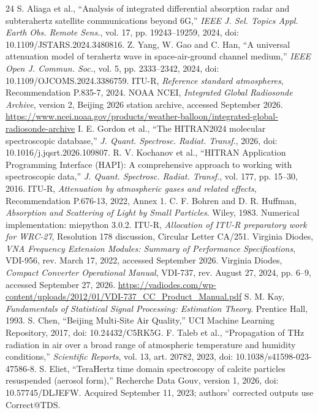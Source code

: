 \documentclass[conference]{IEEEtran}
\begin{document}
\begin{thebibliography}{24}
 S. Aliaga et al., ``Analysis of integrated differential absorption radar and subterahertz satellite communications beyond 6G,'' \emph{IEEE J. Sel. Topics Appl. Earth Obs. Remote Sens.}, vol. 17, pp. 19243--19259, 2024, doi: 10.1109/JSTARS.2024.3480816.
 Z. Yang, W. Gao and C. Han, ``A universal attenuation model of terahertz wave in space-air-ground channel medium,'' \emph{IEEE Open J. Commun. Soc.}, vol. 5, pp. 2333--2342, 2024, doi: 10.1109/OJCOMS.2024.3386759.
 ITU-R, \emph{Reference standard atmospheres}, Recommendation P.835-7, 2024.
 NOAA NCEI, \emph{Integrated Global Radiosonde Archive}, version 2, Beijing 2026 station archive, accessed September 2026. \url{https://www.ncei.noaa.gov/products/weather-balloon/integrated-global-radiosonde-archive}
 I. E. Gordon et al., ``The HITRAN2024 molecular spectroscopic database,'' \emph{J. Quant. Spectrosc. Radiat. Transf.}, 2026, doi: 10.1016/j.jqsrt.2026.109807.
 R. V. Kochanov et al., ``HITRAN Application Programming Interface (HAPI): A comprehensive approach to working with spectroscopic data,'' \emph{J. Quant. Spectrosc. Radiat. Transf.}, vol. 177, pp. 15--30, 2016.
 ITU-R, \emph{Attenuation by atmospheric gases and related effects}, Recommendation P.676-13, 2022, Annex 1.
 C. F. Bohren and D. R. Huffman, \emph{Absorption and Scattering of Light by Small Particles}. Wiley, 1983. Numerical implementation: miepython 3.0.2.
 ITU-R, \emph{Allocation of ITU-R preparatory work for WRC-27}, Resolution 178 discussion, Circular Letter CA/251.
 Virginia Diodes, \emph{VNA Frequency Extension Modules: Summary of Performance Specifications}, VDI-956, rev. March 17, 2022, accessed September 2026.
 Virginia Diodes, \emph{Compact Converter Operational Manual}, VDI-737, rev. August 27, 2024, pp. 6--9, accessed September 27, 2026. \url{https://vadiodes.com/wp-content/uploads/2012/01/VDI-737_CC_Product_Manual.pdf}
 S. M. Kay, \emph{Fundamentals of Statistical Signal Processing: Estimation Theory}. Prentice Hall, 1993.
 S. Chen, ``Beijing Multi-Site Air Quality,'' UCI Machine Learning Repository, 2017, doi: 10.24432/C5RK5G.
 F. Taleb et al., ``Propagation of THz radiation in air over a broad range of atmospheric temperature and humidity conditions,'' \emph{Scientific Reports}, vol. 13, art. 20782, 2023, doi: 10.1038/s41598-023-47586-8.
 S. Eliet, ``TeraHertz time domain spectroscopy of calcite particles resuspended (aerosol form),'' Recherche Data Gouv, version 1, 2026, doi: 10.57745/DLJEFW. Acquired September 11, 2023; authors' corrected outputs use Correct@TDS.

\end{thebibliography}
\end{document}
